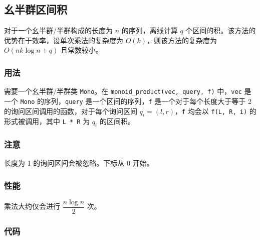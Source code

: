 \subsection{幺半群区间积}

对于一个幺半群/半群构成的长度为 $n$ 的序列，离线计算 $q$ 个区间的积。该方法的优势在于效率，设单次乘法的复杂度为 $O(k)$，则该方法的复杂度为 $O(nk\log n + q)$ 且常数较小。

\subsubsection{用法}

需要一个幺半群/半群类 \lstinline{Mono}。在 \lstinline{monoid_product(vec, query, f)} 中，\lstinline{vec} 是一个 \lstinline{Mono} 的序列，\lstinline{query} 是一个区间的序列，\lstinline{f} 是一个对于每个长度大于等于 2 的询问区间调用的函数，对于每个询问区间 $q_i = (l, r)$，\lstinline{f} 均会以 \lstinline{f(L, R, i)} 的形式被调用，其中 \lstinline{L * R} 为 $q_i$ 的区间积。

\subsubsection{注意}

长度为 1 的询问区间会被忽略。下标从 0 开始。

\subsubsection{性能}

乘法大约仅会进行 $\dfrac{n \log n}{2}$ 次。

\subsubsection{代码}


